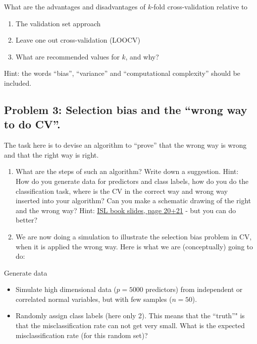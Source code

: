 \documentclass[]{article}
\providecommand{\tightlist}{%
  \setlength{\itemsep}{0pt}\setlength{\parskip}{0pt}}
\begin{document}
What are the advantages and disadvantages of \(k\)-fold cross-validation
relative to

\begin{enumerate}
\def\labelenumi{\alph{enumi})}
\tightlist
\item
  The validation set approach
\item
  Leave one out cross-validation (LOOCV)
\item
  What are recommended values for \(k\), and why?
\end{enumerate}

Hint: the words ``bias'', ``variance'' and ``computational complexity''
should be included.

\hypertarget{problem-3-selection-bias-and-the-wrong-way-to-do-cv.}{%
\subsection{Problem 3: Selection bias and the ``wrong way to do
CV''.}\label{problem-3-selection-bias-and-the-wrong-way-to-do-cv.}}

The task here is to devise an algorithm to ``prove'' that the wrong way
is wrong and that the right way is right.

\begin{enumerate}
\def\labelenumi{\alph{enumi})}
\item
  What are the steps of such an algorithm? Write down a suggestion.
  Hint: How do you generate data for predictors and class labels, how do
  you do the classification task, where is the CV in the correct way and
  wrong way inserted into your algorithm? Can you make a schematic
  drawing of the right and the wrong way? Hint:
  \href{https://lagunita.stanford.edu/c4x/HumanitiesScience/StatLearning/asset/cv_boot.pdf}{ISL
  book slides, page 20+21} - but you can do better?
\item
  We are now doing a simulation to illustrate the selection bias problem
  in CV, when it is applied the wrong way. Here is what we are
  (conceptually) going to do:
\end{enumerate}

Generate data

\begin{itemize}
\item
  Simulate high dimensional data (\(p=5000\) predictors) from
  independent or correlated normal variables, but with few samples
  (\(n=50\)).
\item
  Randomly assign class labels (here only 2). This means that the
  ``truth''" is that the misclassification rate can not get very small.
  What is the expected misclassification rate (for this random set)?
\end{itemize}
\end{document}
